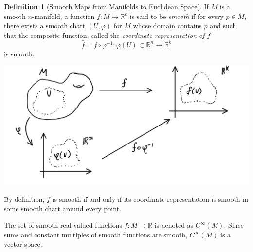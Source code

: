 \documentclass{article}
\theoremstyle{remark}
\theoremstyle{definition}
\newtheorem{definition}{Definition}[section]
\begin{document}
\begin{definition}[Smooth Maps from Manifolds to Euclidean Space]
If $M$ is a smooth $n$-manifold, a function $f: M \longrightarrow \mathbb{R}^k$ is said to be \textit{smooth} if for every $p \in M$, there exists a smooth chart $(U, \varphi)$ for $M$ whose domain contains $p$ and such that the composite function, called the \textit{coordinate representation of $f$}
\[\hat{f} = f \circ \varphi^{-1}: \varphi(U) \subset \mathbb{R}^n \longrightarrow \mathbb{R}^k\]
is smooth. 
\begin{center}
    \includegraphics[scale=0.24]{img/Function_Manifold_to_Euclidean_Space.PNG}
\end{center}
By definition, $f$ is smooth if and only if its coordinate representation is smooth in some smooth chart around every point. 
\end{definition}

The set of smooth real-valued functions $f: M \longrightarrow \mathbb{R}$ is denoted as $C^\infty (M)$. Since sums and constant multiples of smooth functions are smooth, $C^\infty (M)$ is a vector space. 
\end{document}
